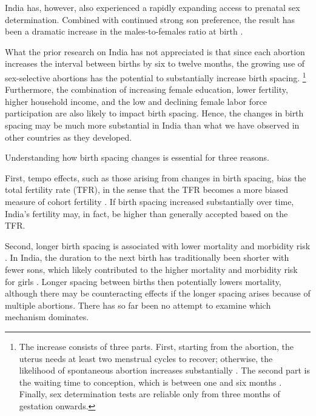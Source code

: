\documentclass[12pt,letterpaper]{article}
\begin{document}
India has, however, also experienced a rapidly expanding 
access to prenatal sex determination.
Combined with continued strong son preference, the result has been a dramatic 
increase in the males-to-females ratio at birth
\citep{das_gupta97,Sudha1999,Arnold2002,retherford03b,Guilmoto2012,
Bongaarts2013,Portner2015b,Jayachandran2017}.

What the prior research on India has not appreciated is that since each abortion 
increases the interval between births by six to twelve months, the growing use of 
sex-selective abortions has the potential to substantially increase birth spacing.%
\footnote{
The increase consists of three parts.
First, starting from the abortion, the uterus needs at 
least two menstrual cycles to recover;  otherwise, the likelihood 
of spontaneous abortion increases substantially \citep{zhou00b}.
The second part is the waiting time to conception, which is between 
one and six months \citep{Wang2003}.
Finally, sex determination tests are reliable only from three months 
of gestation onwards.
}
Furthermore, the combination of increasing female education, 
lower fertility, higher household income, and the low and declining female 
labor force participation are also likely to impact birth spacing.
Hence, the changes in birth spacing may be much more substantial in India 
than what we have observed in other countries as they developed.

Understanding how birth spacing changes is essential for three reasons.

First, tempo effects, such as those arising from changes in birth spacing, bias 
the total fertility rate (TFR), in the sense that the TFR becomes a more biased measure 
of cohort fertility \citep{Hotz1997,Bongaarts1999,Ni-Bhrolchain2011}.
If birth spacing increased substantially over time, India's fertility may, in 
fact, be higher than generally accepted based on the TFR.

Second, longer birth spacing is associated with lower mortality and 
morbidity risk \citep{Conde-Agudelo2012,Molitoris2019}.
In India, the duration to the next birth has traditionally been shorter with fewer sons, 
which likely contributed to the higher mortality and morbidity risk for girls
\citep{Whitworth2002,Bhargava2003,Bhalotra2008,Maitra2008,
Jayachandran2011,Jayachandran2017a}.
Longer spacing between births then potentially lowers mortality, although there may
be counteracting effects if the longer spacing arises because of multiple abortions.
There has so far been no attempt to examine which mechanism dominates.
\end{document}
